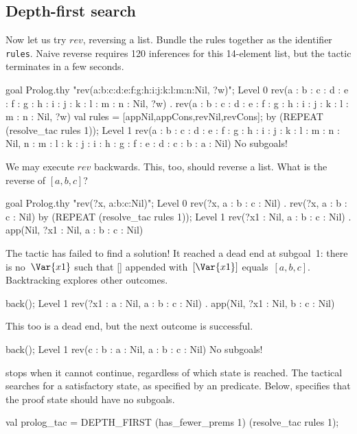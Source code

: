 \subsection{Depth-first search}
Now let us try $rev$, reversing a list.
Bundle the rules together as the \ML{} identifier {\tt rules}.  Naive
reverse requires 120 inferences for this 14-element list, but the tactic
terminates in a few seconds.
\begin{ttbox}
goal Prolog.thy "rev(a:b:c:d:e:f:g:h:i:j:k:l:m:n:Nil, ?w)";
{\out Level 0}
{\out rev(a : b : c : d : e : f : g : h : i : j : k : l : m : n : Nil, ?w)}
{. rev(a : b : c : d : e : f : g : h : i : j : k : l : m : n : Nil,}
{\out         ?w)}
\ttbreak
val rules = [appNil,appCons,revNil,revCons];
\ttbreak
by (REPEAT (resolve_tac rules 1));
{\out Level 1}
{\out rev(a : b : c : d : e : f : g : h : i : j : k : l : m : n : Nil,}
{\out     n : m : l : k : j : i : h : g : f : e : d : c : b : a : Nil)}
{\out No subgoals!}
\end{ttbox}
We may execute $rev$ backwards.  This, too, should reverse a list.  What
is the reverse of $[a,b,c]$?
\begin{ttbox}
goal Prolog.thy "rev(?x, a:b:c:Nil)";
{\out Level 0}
{\out rev(?x, a : b : c : Nil)}
{. rev(?x, a : b : c : Nil)}
\ttbreak
by (REPEAT (resolve_tac rules 1));
{\out Level 1}
{\out rev(?x1 : Nil, a : b : c : Nil)}
{. app(Nil, ?x1 : Nil, a : b : c : Nil)}
\end{ttbox}
The tactic has failed to find a solution!  It reached a dead end at
subgoal~1: there is no~$\Var{x1}$ such that [] appended with~$[\Var{x1}]$
equals~$[a,b,c]$.  Backtracking explores other outcomes.
\begin{ttbox}
back();
{\out Level 1}
{\out rev(?x1 : a : Nil, a : b : c : Nil)}
{. app(Nil, ?x1 : Nil, b : c : Nil)}
\end{ttbox}
This too is a dead end, but the next outcome is successful.
\begin{ttbox}
back();
{\out Level 1}
{\out rev(c : b : a : Nil, a : b : c : Nil)}
{\out No subgoals!}
\end{ttbox}
 stops when it cannot continue, regardless of which state
is reached.  The tactical  searches for a satisfactory
state, as specified by an \ML{} predicate.  Below,
 specifies that the proof state should have no
subgoals.  
\begin{ttbox}
val prolog_tac = DEPTH_FIRST (has_fewer_prems 1) 
                             (resolve_tac rules 1);
\end{ttbox}
